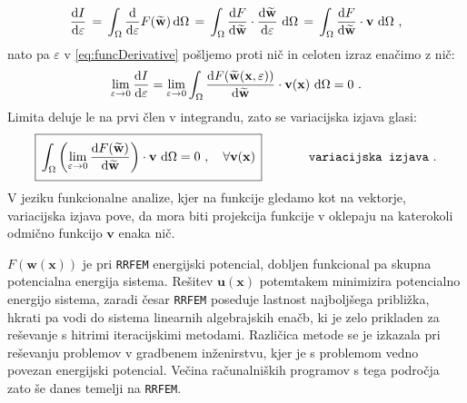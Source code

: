\begin{equation}
\frac{\mathrm{d} I}{\mathrm{d} \varepsilon} \, = \, \int_{\Omega} \frac{\mathrm{d}}{\mathrm{d} \varepsilon} F(\widetilde{\mathbf{w}}) \, \mathrm{d} \Omega \, = \, \int_{\Omega} \frac{\mathrm{d} F}{\mathrm{d} \widetilde{\mathbf{w}}} \cdot \frac{\mathrm{d} \widetilde{\mathbf{w}}}{\mathrm{d} \varepsilon} \ \mathrm{d} \Omega \, = \, \int_{\Omega} \frac{\mathrm{d} F}{\mathrm{d} \widetilde{\mathbf{w}}} \cdot \mathbf{v} \ \mathrm{d} \Omega \ ,
\label{eq:funcDerivative}
\end{equation}
nato pa $\varepsilon$ v \eqref{eq:funcDerivative} pošljemo proti nič in celoten izraz enačimo z nič:
\begin{equation}
	\lim_{\varepsilon \rightarrow 0} \frac{\ud I}{\ud \varepsilon} = \lim_{\varepsilon \rightarrow 0} \int_{\Omega} \frac{\ud F(\widetilde{\mathbf{w}}(\mathbf{x}, \varepsilon))}{\ud \widetilde{\mathbf{w}}} \cdot \mathbf{v(\mathbf{x})} \ \ud \Omega = 0 \ .
\end{equation}
Limita deluje le na prvi člen v integrandu, zato se variacijska izjava glasi:
\begin{equation}
	\boxed{\, \int_{\Omega} \left( \lim_{\varepsilon \rightarrow 0} \frac{\ud F(\widetilde{\mathbf{w}})}{\ud \widetilde{\mathbf{w}}} \right) \cdot \mathbf{v} \ \ud \Omega = 0 \ , \quad \forall \mathbf{v(\mathbf{x})}\, \vphantom{\Biggr{)}}} \hspace{1.3cm} \texttt{variacijska izjava} \ .
	\label{eq:variationalStatement}
\end{equation}
V jeziku funkcionalne analize, kjer na funkcije gledamo kot na vektorje, variacijska izjava pove, da mora biti projekcija funkcije v oklepaju na katerokoli odmično funkcijo $\mathbf{v}$ enaka nič.

$F\left(\mathbf{w}(\mathbf{x})\right)$ je pri \texttt{RRFEM} energijski potencial, dobljen funkcional pa skupna potencialna energija sistema. Rešitev $\mathbf{u}(\mathbf{x})$ potemtakem minimizira potencialno energijo sistema, zaradi česar \texttt{RRFEM} poseduje last\-nost najboljšega približka, hkrati pa vodi do sistema linearnih algebrajskih enačb, ki je zelo prikladen za reševanje s hitrimi iteracijskimi metodami. Različica metode se je izkazala pri reševanju problemov v gradbenem inženirstvu, kjer je s problemom vedno povezan energijski potencial. Večina računalniških programov s tega področja zato še danes temelji na \texttt{RRFEM}.

